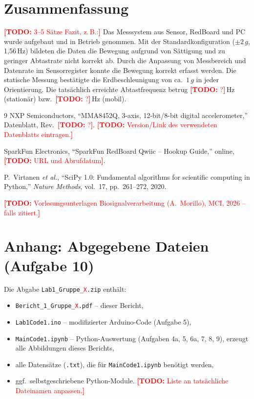 \documentclass[a4paper,oneside,10pt]{article}
\newcommand{\todo}[1]{\textcolor{red}{\textbf{[TODO:} #1\textbf{]}}}
\def\gruppennr{\textcolor{red}{X}} %
\begin{document}
\section{Zusammenfassung}
\todo{3--5 Sätze Fazit, z.\,B.:} Das Messsystem aus Sensor, RedBoard und PC
wurde aufgebaut und in Betrieb genommen. Mit der Standardkonfiguration
($\pm 2\,g$, 1{,}56\,Hz) bildeten die Daten die Bewegung aufgrund von Sättigung
und zu geringer Abtastrate nicht korrekt ab. Durch die Anpassung von Messbereich
und Datenrate im Sensorregister konnte die Bewegung korrekt erfasst werden. Die
statische Messung bestätigte die Erdbeschleunigung von ca.\ $1\,g$ in jeder
Orientierung. Die tatsächlich erreichte Abtastfrequenz betrug \todo{?}\,Hz
(stationär) bzw.\ \todo{?}\,Hz (mobil).

\begin{thebibliography}{9}
NXP Semiconductors, ``MMA8452Q, 3-axis, 12-bit/8-bit digital accelerometer,'' Datenblatt,
Rev.~\todo{?}. \todo{Version/Link des verwendeten Datenblatts eintragen.}

SparkFun Electronics, ``SparkFun RedBoard Qwiic -- Hookup Guide,'' online,
\todo{URL und Abrufdatum}.

P.~Virtanen \emph{et al.}, ``SciPy 1.0: Fundamental algorithms for scientific computing in Python,''
\emph{Nature Methods}, vol.~17, pp.~261--272, 2020.

\todo{Vorlesungsunterlagen Biosignalverarbeitung (A.~Morillo), MCI, 2026 -- falls zitiert.}
\end{thebibliography}

\appendix
\section{Anhang: Abgegebene Dateien (Aufgabe 10)}
Die Abgabe \texttt{Lab1\_Gruppe\_\gruppennr.zip} enthält:
\begin{itemize}
  \item \texttt{Bericht\_1\_Gruppe\_\gruppennr.pdf} -- dieser Bericht,
  \item \texttt{Lab1Code1.ino} -- modifizierter Arduino-Code (Aufgabe 5),
  \item \texttt{MainCode1.ipynb} -- Python-Auswertung (Aufgaben 4a, 5, 6a, 7, 8, 9), erzeugt alle Abbildungen dieses Berichts,
  \item alle Datensätze (\texttt{.txt}), die für \texttt{MainCode1.ipynb} benötigt werden,
  \item ggf.\ selbstgeschriebene Python-Module. \todo{Liste an tatsächliche Dateinamen anpassen.}
\end{itemize}
\end{document}
